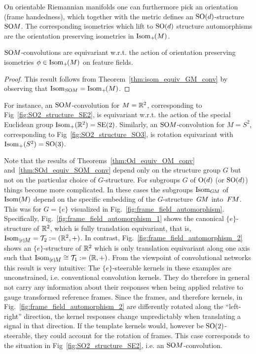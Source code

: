 On orientable Riemannian manifolds one can furthermore pick an orientation (frame handedness), which together with the metric defines an $\operatorname{SO}(d)$-structure $\operatorname{SO}\mkern-3.6muM$.
The corresponding isometries which lift to $\operatorname{SO}(d)$ structure automorphisms are the orientation preserving isometries in $\operatorname{Isom}_+\mkern-2mu(M)$.
\begin{thm}
\label{thm:SOd_equiv_SOM_conv}
    $\operatorname{SO}\mkern-3.6muM$-convolutions are equivariant w.r.t. the action of orientation preserving isometries $\phi \in \operatorname{Isom}_+\mkern-2mu(M)$ on feature fields.
\end{thm}
\begin{proof}
    This result follows from Theorem~\eqref{thm:isom_equiv_GM_conv} by observing that $\operatorname{Isom}_{\mkern1mu\operatorname{SO}\mkern-3.6muM} = \operatorname{Isom}_+\mkern-2mu(M)$.
\end{proof}
For instance, an $\operatorname{SO}\mkern-3.6muM$-convolution for $M=\mathbb{R}^2$, corresponding to Fig~\ref{fig:SO2_structure_SE2}, is equivariant w.r.t. the action of the special Euclidean group $\operatorname{Isom}_+(\mathbb{R}^2) = \operatorname{SE}(2)$.
Similarly, an $\operatorname{SO}\mkern-3.6muM$-convolution for $M=S^2$, corresponding to Fig~\ref{fig:SO2_structure_SO3}, is rotation equivariant with $\operatorname{Isom}_+(S^2) = \operatorname{SO}(3)$.


Note that the results of Theorems~\ref{thm:Od_equiv_OM_conv} and~\ref{thm:SOd_equiv_SOM_conv} depend only on the structure group $G$ but not on the particular choice of $G$-structure.
For subgroups $G$ of $\operatorname{O}(d)$ (or $\operatorname{SO}(d)$) things become more complicated.
In these cases the subgroups $\operatorname{Isom}_{G\mkern-1.4muM}$ of $\operatorname{Isom}(\mkern-1.5mu M \mkern-.5mu)$ depend on the specific embedding of the $G$-structure~$G\mkern-1.4muM$ into~$F\mkern-1.5muM$.
This was for $G=\{e\}$ visualized in Fig.~\ref{fig:frame_field_automorphism}.
Specifically, Fig.~\ref{fig:frame_field_automorphism_1} shows the canonical $\{e\}$-structure of $\mathbb{R}^2$, which is fully translation equivariant, that is, $\IsomeM = \Trans_2 := (\R^2,+)$.
In contrast, Fig.~\ref{fig:frame_field_automorphism_2} shows an $\{e\}$-structure of $\mathbb{R}^2$ which is only translation equivariant along one axis such that $\IsomeM \cong \Trans_1 := (\R,+)$.
From the viewpoint of convolutional networks this result is very intuitive:
The $\{e\}$-steerable kernels in these examples are unconstrained, i.e. conventional convolution kernels.
They do therefore in general not carry any information about their responses when being applied relative to gauge transformed reference frames.
Since the frames, and therefore kernels, in Fig.~\ref{fig:frame_field_automorphism_2} are differently rotated along the ``left-right'' direction, the kernel responses change unpredictably when translating a signal in that direction.
If the template kernels would, however be $\operatorname{SO}(2)$-steerable, they could account for the rotation of frames.
This case corresponds to the situation in Fig~\ref{fig:SO2_structure_SE2}, i.e. an $\operatorname{SO}\mkern-3.6muM$-convolution.
